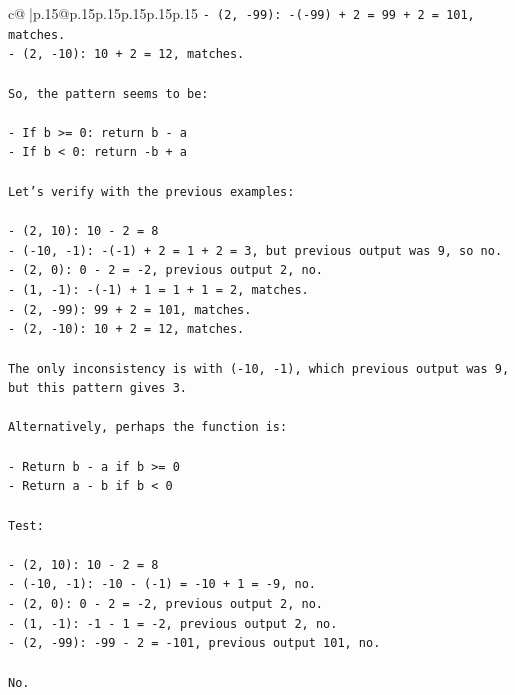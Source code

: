 \documentclass{article}
\begin{document}
{\begin{supertabular}{c@{$\;$}|p{.15\linewidth}@{}p{.15\linewidth}p{.15\linewidth}p{.15\linewidth}p{.15\linewidth}p{.15\linewidth}}
{{{\texttt{{-} (2, {-}99): {-}({-}99) + 2 = 99 + 2 = 101, matches.} \\
\texttt{{-} (2, {-}10): 10 + 2 = 12, matches.} \\
\\ 
\texttt{So, the pattern seems to be:} \\
\\ 
\texttt{{-} If b >= 0: return b {-} a} \\
\texttt{{-} If b < 0: return {-}b + a} \\
\\ 
\texttt{Let's verify with the previous examples:} \\
\\ 
\texttt{{-} (2, 10): 10 {-} 2 = 8} \\
\texttt{{-} ({-}10, {-}1): {-}({-}1) + 2 = 1 + 2 = 3, but previous output was 9, so no.} \\
\texttt{{-} (2, 0): 0 {-} 2 = {-}2, previous output 2, no.} \\
\texttt{{-} (1, {-}1): {-}({-}1) + 1 = 1 + 1 = 2, matches.} \\
\texttt{{-} (2, {-}99): 99 + 2 = 101, matches.} \\
\texttt{{-} (2, {-}10): 10 + 2 = 12, matches.} \\
\\ 
\texttt{The only inconsistency is with ({-}10, {-}1), which previous output was 9, but this pattern gives 3.} \\
\\ 
\texttt{Alternatively, perhaps the function is:} \\
\\ 
\texttt{{-} Return b {-} a if b >= 0} \\
\texttt{{-} Return a {-} b if b < 0} \\
\\ 
\texttt{Test:} \\
\\ 
\texttt{{-} (2, 10): 10 {-} 2 = 8} \\
\texttt{{-} ({-}10, {-}1): {-}10 {-} ({-}1) = {-}10 + 1 = {-}9, no.} \\
\texttt{{-} (2, 0): 0 {-} 2 = {-}2, previous output 2, no.} \\
\texttt{{-} (1, {-}1): {-}1 {-} 1 = {-}2, previous output 2, no.} \\
\texttt{{-} (2, {-}99): {-}99 {-} 2 = {-}101, previous output 101, no.} \\
\\ 
\texttt{No.} \\
}}}
\end{supertabular}}
\end{document}
